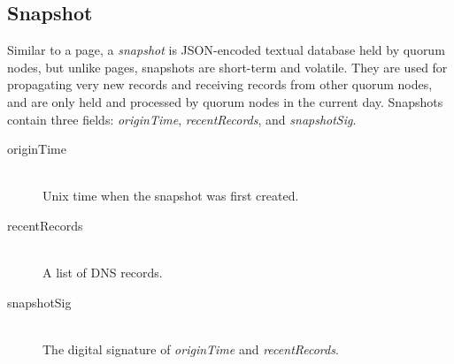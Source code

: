 %
%			
%			
%			
%			
%			
%			

\subsection{Snapshot}

Similar to a page, a \emph{snapshot} is JSON-encoded textual database held by quorum nodes, but unlike pages, snapshots are short-term and volatile. They are used for propagating very new records and receiving records from other quorum nodes, and are only held and processed by quorum nodes in the current day. Snapshots contain three fields: \emph{originTime}, \emph{recentRecords}, and \emph{snapshotSig}.

\begin{description}
	\item[originTime] \hfill \\
		Unix time when the snapshot was first created.
	\item[recentRecords] \hfill \\
		A list of DNS records.
	\item[snapshotSig] \hfill \\
		The digital signature of \emph{originTime} and \emph{recentRecords}.
\end{description}

